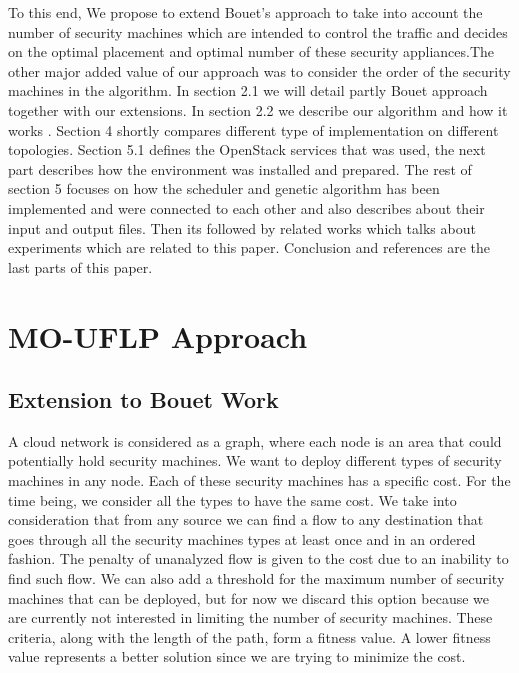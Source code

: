 \documentclass{article}
\begin{document}
To this end, We propose to extend Bouet's approach to take into account the number of security machines which are intended to control the traffic and decides on the optimal placement and optimal number of these security appliances.The other major added value  of our approach was to consider the order of the security machines in the algorithm. In section 2.1 we will detail partly Bouet approach together with our extensions. In section 2.2 we describe our algorithm and how it works . Section 4 shortly compares different type of implementation on different topologies. Section 5.1 defines the OpenStack services that was used, the next part describes how the environment was installed and prepared. The rest of section 5 focuses on how the scheduler and genetic algorithm has been implemented and were connected to each other and also describes about their input and output files. Then its followed by related works which talks about experiments which are related to this paper. Conclusion and references are the last parts of this paper.


\section{MO-UFLP Approach}
\subsection{Extension to Bouet Work}

 A cloud network is considered as a graph, where each node is an area that could potentially hold security machines. We want to deploy different types of security machines in any node. Each of these security machines has a specific cost. For the time being, we consider all the types to have the same cost. We  take into consideration that from any source we can find a flow to any destination that goes through all the security machines types at least once and in an ordered fashion. The penalty of unanalyzed flow is given to the cost due to an inability to find such flow.
 We can also add a threshold for the maximum number of security machines that can be deployed, but for now we discard this option because we are currently not interested in limiting the number of security machines. These criteria, along with the length of the path, form a fitness value. A lower fitness value represents a better solution since we are trying to minimize the cost.\\ \newline
\end{document}
